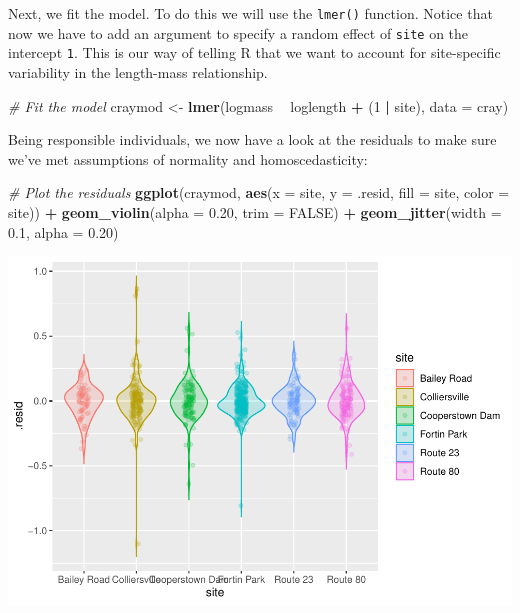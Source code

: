 \documentclass[
]{book}
\newenvironment{Shaded}{\begin{snugshade}}{\end{snugshade}}
\newcommand{\CommentTok}[1]{\textcolor[rgb]{0.56,0.35,0.01}{\textit{#1}}}
\newcommand{\DataTypeTok}[1]{\textcolor[rgb]{0.13,0.29,0.53}{#1}}
\newcommand{\DecValTok}[1]{\textcolor[rgb]{0.00,0.00,0.81}{#1}}
\newcommand{\FloatTok}[1]{\textcolor[rgb]{0.00,0.00,0.81}{#1}}
\newcommand{\KeywordTok}[1]{\textcolor[rgb]{0.13,0.29,0.53}{\textbf{#1}}}
\newcommand{\NormalTok}[1]{#1}
\newcommand{\OperatorTok}[1]{\textcolor[rgb]{0.81,0.36,0.00}{\textbf{#1}}}
\newcommand{\OtherTok}[1]{\textcolor[rgb]{0.56,0.35,0.01}{#1}}
\newcommand{\StringTok}[1]{\textcolor[rgb]{0.31,0.60,0.02}{#1}}
\begin{document}
Next, we fit the model. To do this we will use the \texttt{lmer()} function. Notice that now we have to add an argument to specify a random effect of \texttt{site} on the intercept \texttt{1}. This is our way of telling R that we want to account for site-specific variability in the length-mass relationship.

\begin{Shaded}
\begin{Highlighting}[]
\CommentTok{# Fit the model}
\NormalTok{craymod <-}\StringTok{ }\KeywordTok{lmer}\NormalTok{(logmass }\OperatorTok{~}\StringTok{ }\NormalTok{loglength }\OperatorTok{+}\StringTok{ }\NormalTok{(}\DecValTok{1} \OperatorTok{|}\StringTok{ }\NormalTok{site), }\DataTypeTok{data =}\NormalTok{ cray)}
\end{Highlighting}
\end{Shaded}

Being responsible individuals, we now have a look at the residuals to make sure we've met assumptions of normality and homoscedasticity:

\begin{Shaded}
\begin{Highlighting}[]
\CommentTok{# Plot the residuals}
\KeywordTok{ggplot}\NormalTok{(craymod, }\KeywordTok{aes}\NormalTok{(}\DataTypeTok{x =}\NormalTok{ site, }\DataTypeTok{y =}\NormalTok{ .resid, }\DataTypeTok{fill =}\NormalTok{ site, }\DataTypeTok{color =}\NormalTok{ site)) }\OperatorTok{+}
\StringTok{  }\KeywordTok{geom_violin}\NormalTok{(}\DataTypeTok{alpha =} \FloatTok{0.20}\NormalTok{, }\DataTypeTok{trim =} \OtherTok{FALSE}\NormalTok{) }\OperatorTok{+}
\StringTok{  }\KeywordTok{geom_jitter}\NormalTok{(}\DataTypeTok{width =} \FloatTok{0.1}\NormalTok{, }\DataTypeTok{alpha =} \FloatTok{0.20}\NormalTok{)}
\end{Highlighting}
\end{Shaded}

\includegraphics{worstr_files/figure-latex/unnamed-chunk-378-1.pdf}
\end{document}
